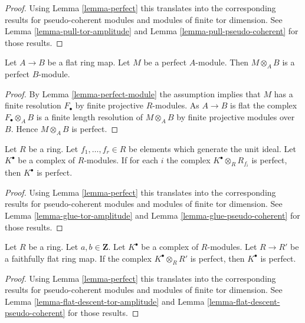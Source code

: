 \begin{proof}
Using
Lemma \ref{lemma-perfect}
this translates into the corresponding results for pseudo-coherent modules
and modules of finite tor dimension. See
Lemma \ref{lemma-pull-tor-amplitude}
and
Lemma \ref{lemma-pull-pseudo-coherent}
for those results.
\end{proof}

\begin{lemma}
\label{lemma-flat-base-change-perfect}
Let $A \to B$ be a flat ring map. Let $M$ be a perfect $A$-module.
Then $M \otimes_A B$ is a perfect $B$-module.
\end{lemma}

\begin{proof}
By
Lemma \ref{lemma-perfect-module}
the assumption implies that $M$ has a finite resolution $F_\bullet$ by
finite projective $R$-modules. As $A \to B$ is flat the complex
$F_\bullet \otimes_A B$ is a finite length resolution of $M \otimes_A B$
by finite projective modules over $B$. Hence $M \otimes_A B$ is perfect.
\end{proof}

\begin{lemma}
\label{lemma-glue-perfect}
Let $R$ be a ring. Let $f_1, \ldots, f_r \in R$ be elements which
generate the unit ideal. Let $K^\bullet$
be a complex of $R$-modules. If for each $i$ the complex
$K^\bullet \otimes_R R_{f_i}$ is perfect,
then $K^\bullet$ is perfect.
\end{lemma}

\begin{proof}
Using
Lemma \ref{lemma-perfect}
this translates into the corresponding results for pseudo-coherent modules
and modules of finite tor dimension. See
Lemma \ref{lemma-glue-tor-amplitude}
and
Lemma \ref{lemma-glue-pseudo-coherent}
for those results.
\end{proof}

\begin{lemma}
\label{lemma-flat-descent-perfect}
Let $R$ be a ring. Let $a, b \in \mathbf{Z}$. Let $K^\bullet$
be a complex of $R$-modules. Let $R \to R'$ be a faithfully flat
ring map. If the complex $K^\bullet \otimes_R R'$ is perfect, then
$K^\bullet$ is perfect.
\end{lemma}

\begin{proof}
Using
Lemma \ref{lemma-perfect}
this translates into the corresponding results for pseudo-coherent modules
and modules of finite tor dimension. See
Lemma \ref{lemma-flat-descent-tor-amplitude}
and
Lemma \ref{lemma-flat-descent-pseudo-coherent}
for those results.
\end{proof}

